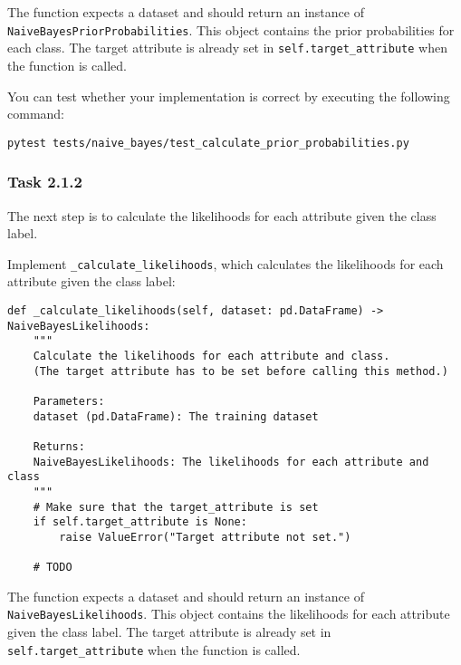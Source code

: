 \documentclass[
english,
smallborders
]{i6prcsht}
\begin{document}
\vspace*{0.1cm}

The function expects a dataset and should return an instance of \texttt{NaiveBayesPriorProbabilities}. This object contains the prior probabilities for each class. The target attribute is already set in \texttt{self.target\_attribute} when the function is called.

You can test whether your implementation is correct by executing the following command:

\vspace*{0.3cm}

\begin{lstlisting}
pytest tests/naive_bayes/test_calculate_prior_probabilities.py
\end{lstlisting}

\vspace*{0.1cm}

\subsubsection*{Task 2.1.2}

The next step is to calculate the likelihoods for each attribute given the class label.

Implement \texttt{\_calculate\_likelihoods}, which calculates the likelihoods for each attribute given the class label:

\vspace*{0.3cm}

\begin{lstlisting}
def _calculate_likelihoods(self, dataset: pd.DataFrame) -> NaiveBayesLikelihoods:
	"""
	Calculate the likelihoods for each attribute and class.
	(The target attribute has to be set before calling this method.)

	Parameters:
	dataset (pd.DataFrame): The training dataset

	Returns:
	NaiveBayesLikelihoods: The likelihoods for each attribute and class
	"""
	# Make sure that the target_attribute is set
	if self.target_attribute is None:
		raise ValueError("Target attribute not set.")

	# TODO
\end{lstlisting}

\vspace*{0.1cm}

The function expects a dataset and should return an instance of \texttt{NaiveBayesLikelihoods}. This object contains the likelihoods for each attribute given the class label. The target attribute is already set in \texttt{self.target\_attribute} when the function is called.
\end{document}
